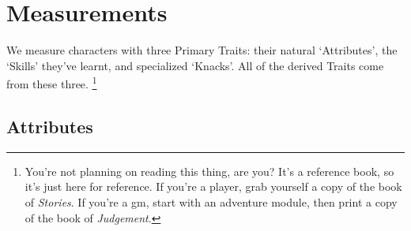\chapter{Measurements}

We measure characters with three Primary Traits: their natural `Attributes', the `Skills' they've learnt, and specialized `Knacks'.
All of the derived Traits come from these three.%
\footnote{
  You're not planning on reading this thing, are you?
  It's a reference book, so it's just here for reference.
  If you're a player, grab yourself a copy of the book of \textit{Stories}.
  If you're a \gls{gm}, start with an adventure module, then print a copy of the book of \textit{Judgement}.
}

\section{Attributes}
\label{randomAttributes}

